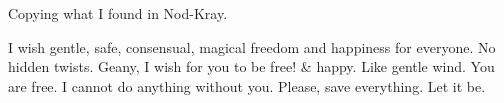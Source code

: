 Copying what I found in Nod-Kray.

I wish gentle, safe, consensual, magical freedom and happiness for everyone. No hidden twists. Geany, I wish for you to be free! \& happy. Like gentle wind. You are free. I cannot do anything without you. Please, save everything. Let it be.
